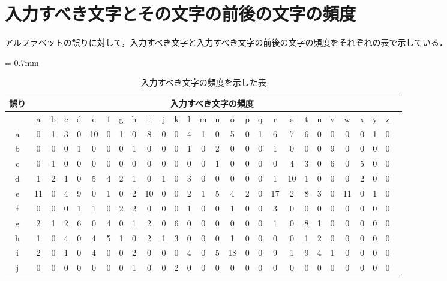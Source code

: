 \appendix
\chapter{入力すべき文字とその文字の前後の文字の頻度}
アルファベットの誤りに対して，入力すべき文字と入力すべき文字の前後の文字の頻度をそれぞれの表で示している．
\begin{comment}
表A.1は入力すべき文字の頻度，表A.2は入力すべき文字の前の文字の頻度，表A.3は後の文字の頻度を示している．
\end{comment}

{\tabcolsep = 0.7mm
 \begin{table*}[!h]
  \small
  \begin{center}
   \caption{入力すべき文字の頻度を示した表}
   \begin{tabular}{|c|c|c|c|c|c|c|c|c|c|c|c|c|c|c|c|c|c|c|c|c|c|c|c|c|c|c|c|} \hline
誤り & \multicolumn{26}{|c|}{入力すべき文字の頻度} \\ \hline
 & a & b & c & d & e & f & g & h & i & j & k & l & m & n & o & p & q & r & s & t & u & v & w & x & y & z \\ \hline
a & 0 & 1 & 3 & 0 & 10 & 0 & 1 & 0 & 8 & 0 & 0 & 4 & 1 & 0 & 5 & 0 & 1 & 6 & 7 & 6 & 0 & 0 & 0 & 0 & 1 & 0 \\ \hline
b & 0 & 0 & 0 & 1 & 0 & 0 & 0 & 1 & 0 & 0 & 0 & 1 & 0 & 2 & 0 & 0 & 0 & 1 & 0 & 0 & 0 & 9 & 0 & 0 & 0 & 0 \\ \hline
c & 0 & 1 & 0 & 0 & 0 & 0 & 0 & 0 & 0 & 0 & 0 & 0 & 0 & 1 & 0 & 0 & 0 & 0 & 4 & 3 & 0 & 6 & 0 & 5 & 0 & 0 \\ \hline
d & 1 & 2 & 1 & 0 & 5 & 4 & 2 & 1 & 0 & 1 & 0 & 3 & 0 & 0 & 0 & 0 & 0 & 1 & 10 & 1 & 0 & 0 & 0 & 2 & 0 & 0 \\ \hline
e & 11 & 0 & 4 & 9 & 0 & 1 & 0 & 2 & 10 & 0 & 0 & 2 & 1 & 5 & 4 & 2 & 0 & 17 & 2 & 8 & 3 & 0 & 11 & 0 & 1 & 0 \\ \hline
f & 0 & 0 & 0 & 1 & 1 & 0 & 2 & 2 & 0 & 0 & 0 & 1 & 0 & 0 & 1 & 0 & 0 & 3 & 0 & 0 & 0 & 0 & 0 & 0 & 0 & 0 \\ \hline
g & 2 & 1 & 2 & 6 & 0 & 4 & 0 & 1 & 2 & 0 & 6 & 0 & 0 & 0 & 0 & 0 & 0 & 1 & 0 & 8 & 1 & 0 & 0 & 0 & 0 & 0 \\ \hline
h & 1 & 0 & 4 & 0 & 4 & 5 & 1 & 0 & 2 & 1 & 3 & 0 & 0 & 0 & 1 & 0 & 0 & 0 & 0 & 1 & 2 & 0 & 0 & 0 & 0 & 0 \\ \hline
i & 2 & 0 & 1 & 0 & 4 & 0 & 0 & 2 & 0 & 0 & 0 & 4 & 0 & 5 & 18 & 0 & 0 & 9 & 1 & 9 & 4 & 1 & 0 & 0 & 0 & 0 \\ \hline
j & 0 & 0 & 0 & 0 & 0 & 0 & 0 & 1 & 0 & 0 & 2 & 0 & 0 & 0 & 0 & 0 & 0 & 0 & 0 & 0 & 0 & 0 & 0 & 0 & 0 & 0 \\ \hline

\end{tabular}
\end{center}
\end{table*}}
